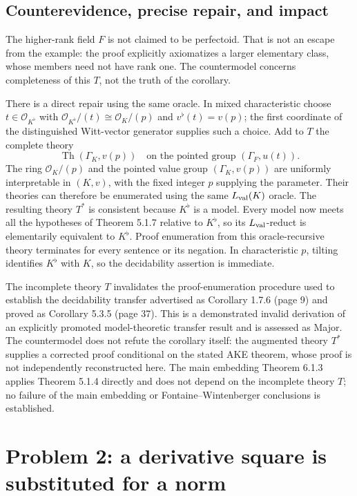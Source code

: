 \documentclass[10pt]{article}
\begin{document}
\subsection*{Counterevidence, precise repair, and impact}
The higher-rank field \(F\) is not claimed to be perfectoid. That is not an escape from the example: the proof explicitly axiomatizes a larger elementary class, whose members need not have rank one. The countermodel concerns completeness of this \(T\), not the truth of the corollary.\par
There is a direct repair using the same oracle. In mixed characteristic choose \(t\in\mathcal O_{K^\flat}\) with \(\mathcal O_{K^\flat}/(t)\cong\mathcal O_K/(p)\) and \(v^\flat(t)=v(p)\); the first coordinate of the distinguished Witt-vector generator supplies such a choice. Add to \(T\) the complete theory \[\operatorname{Th}(\Gamma_K,v(p))
 \quad\text{on the pointed group }(\Gamma_F,u(t)).
 \tag{3.6}\] The ring \(\mathcal O_K/(p)\) and the pointed value group \((\Gamma_K,v(p))\) are uniformly interpretable in \((K,v)\), with the fixed integer \(p\) supplying the parameter. Their theories can therefore be enumerated using the same \(L_{\rm val}(K)\) oracle. The resulting theory \(T^*\) is consistent because \(K^\flat\) is a model. Every model now meets all the hypotheses of Theorem 5.1.7 relative to \(K^\flat\), so its \(L_{\rm val}\)-reduct is elementarily equivalent to \(K^\flat\). Proof enumeration from this oracle-recursive theory terminates for every sentence or its negation. In characteristic \(p\), tilting identifies \(K^\flat\) with \(K\), so the decidability assertion is immediate.\par
The incomplete theory \(T\) invalidates the proof-enumeration procedure used to establish the decidability transfer advertised as Corollary 1.7.6 (page 9) and proved as Corollary 5.3.5 (page 37). This is a demonstrated invalid derivation of an explicitly promoted model-theoretic transfer result and is assessed as Major. The countermodel does not refute the corollary itself: the augmented theory \(T^*\) supplies a corrected proof conditional on the stated AKE theorem, whose proof is not independently reconstructed here. The main embedding Theorem 6.1.3 applies Theorem 5.1.4 directly and does not depend on the incomplete theory \(T\); no failure of the main embedding or Fontaine–Wintenberger conclusions is established.\par
\section*{Problem 2: a derivative square is substituted for a norm}
\end{document}
